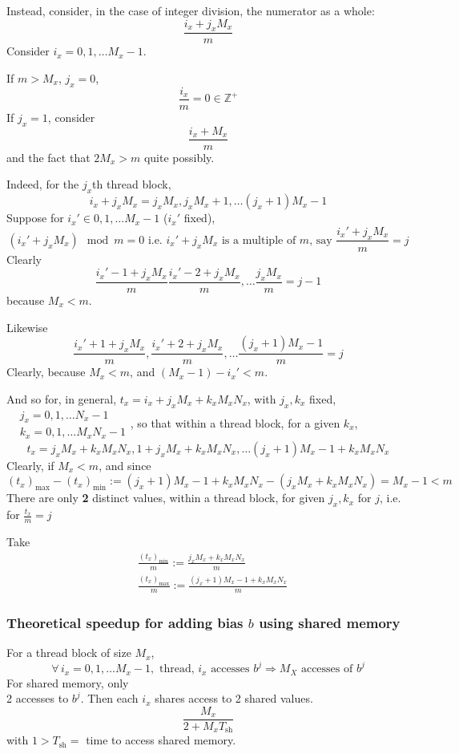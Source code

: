 \documentclass[10pt]{amsart}
\begin{document}
\begin{multicols*}{2}
Instead, consider, in the case of integer division, the numerator as a whole:
\[
\frac{i_x + j_xM_x}{m}
\]
Consider $i_x = 0,1,\dots M_x-1$.  

If $m>M_x$, $j_x=0$, 
\[
\frac{i_x}{m} =0 \in \mathbb{Z}^+
\]
If $j_x = 1$, consider 
\[
\frac{i_x + M_x}{m}
\]
and the fact that $2M_x >m$ quite possibly.  

Indeed, for the $j_x$th thread block, 
\[
i_x + j_x M_x = j_x M_x , j_x M_x + 1 , \dots (j_x+1) M_x - 1
\]
Suppose for $i_x' \in 0,1,\dots M_x-1$ ($i_x'$ fixed), 
\[
(i_x' + j_x M_x ) \mod{m} = 0 \text{ i.e. } i_x' + j_xM_x \text{ is a multiple of $m$, say } \frac{ i_x' + j_x M_x }{ m} = j 
\]
Clearly 
\[
\frac{i_x' - 1+j_xM_x }{m}\frac{i_x' - 2+j_xM_x }{m}, \dots \frac{j_xM_x}{m} = j-1
\] because $M_x < m$.  

Likewise
\[
\frac{ i_x' + 1 + j_x M_x}{m} , \frac{ i_x' + 2 + j_x M_x}{m}, \dots \frac{ (j_x+1) M_x - 1}{m} =j 
\]
Clearly, because $M_x < m$, and $(M_x-1) - i_x' < m$.  

And so for, in general, $t_x = i_x + j_x M_x + k_x M_x N_x$, with $j_x,k_x$ fixed, \quad  $\begin{aligned} & j_x = 0 ,1,\dots N_x - 1\\ 
& k_x = 0,1, \dots M_x N_x - 1 \end{aligned}$, so that within a thread block, for a given $k_x$, 
\[
t_x = j_x M_x + k_x M_xN_x , 1+ j_x M_x + k_x M_x N_x , \dots (j_x+1) M_x - 1 + k_x M_x N_x
\]
Clearly, if $M_x < m$, and since 
\[
(t_x)_{\max} - (t_x)_{\min} := (j_x+1)M_x - 1 + k_x M_x N_x - (j_xM_x + k_xM_x N_x) = M_x - 1 < m 
\]
There are only \textbf{2} distinct values, within a thread block, for given $j_x,k_x$ for $j$, i.e. for $\frac{t_x}{m} = j$  

Take 
\[
\begin{aligned}
& \frac{ (t_x)_{\min} }{ m} :=  \frac{ j_x M_x + k_x M_x N_x }{ m } \\ 
& \frac{ (t_x)_{\max} }{ m} :=  \frac{ (j_x + 1) M_x - 1 + k_x M_x N_x }{ m }
\end{aligned}
\]

\subsubsection{Theoretical speedup for adding bias $b$ using shared memory}
For a thread block of size $M_x$, 
\[
\forall \, i_x = 0,1,\dots M_x -1, \text{ thread, $i_x$ accesses } b^j \Longrightarrow M_X \text{ accesses of } b^j
\]
For shared memory, only \\
2 accesses to $b^j$.  Then each $i_x$ shares access to 2 shared values.  
\[
\frac{M_x}{ 2+M_x T_{\text{sh}} }
\]with $1 > T_{\text{sh} } = $ time to access shared memory.  






\end{multicols*}
\end{document}
